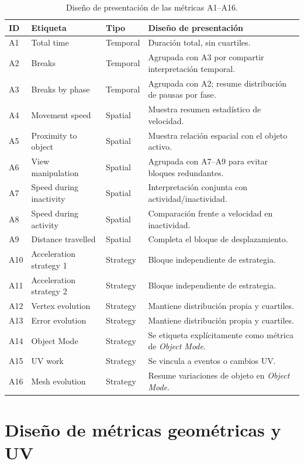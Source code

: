 \begin{table}[H]
\centering
\scriptsize
\renewcommand{\arraystretch}{1.12}
\begin{tabularx}{\textwidth}{p{1.3cm}p{3.8cm}p{2.5cm}X}
\toprule
\textbf{ID} & \textbf{Etiqueta} & \textbf{Tipo} & \textbf{Diseño de presentación} \\
\midrule
A1 & Total time & Temporal & Duración total, sin cuartiles. \\
A2 & Breaks & Temporal & Agrupada con A3 por compartir interpretación temporal. \\
A3 & Breaks by phase & Temporal & Agrupada con A2; resume distribución de pausas por fase. \\
A4 & Movement speed & Spatial & Muestra resumen estadístico de velocidad. \\
A5 & Proximity to object & Spatial & Muestra relación espacial con el objeto activo. \\
A6 & View manipulation & Spatial & Agrupada con A7--A9 para evitar bloques redundantes. \\
A7 & Speed during inactivity & Spatial & Interpretación conjunta con actividad/inactividad. \\
A8 & Speed during activity & Spatial & Comparación frente a velocidad en inactividad. \\
A9 & Distance travelled & Spatial & Completa el bloque de desplazamiento. \\
A10 & Acceleration strategy 1 & Strategy & Bloque independiente de estrategia. \\
A11 & Acceleration strategy 2 & Strategy & Bloque independiente de estrategia. \\
A12 & Vertex evolution & Strategy & Mantiene distribución propia y cuartiles. \\
A13 & Error evolution & Strategy & Mantiene distribución propia y cuartiles. \\
A14 & Object Mode & Strategy & Se etiqueta explícitamente como métrica de \textit{Object Mode}. \\
A15 & UV work & Strategy & Se vincula a eventos o cambios UV. \\
A16 & Mesh evolution & Strategy & Resume variaciones de objeto en \textit{Object Mode}. \\
\bottomrule
\end{tabularx}
\caption{Diseño de presentación de las métricas A1--A16.}
\label{tab:c-diseno-a1-A16}
\end{table}

\section{Diseño de métricas geométricas y UV}
\label{sec:c-diseno-geom-uv}

